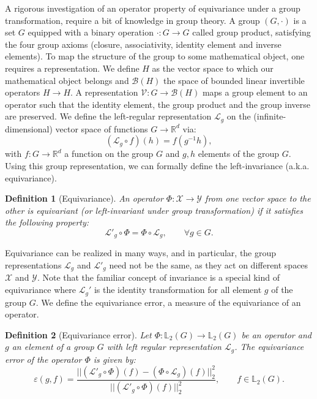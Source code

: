 \documentclass{article}
\newtheorem{definition}{Definition}[section]
\begin{document}
A rigorous investigation of an operator property of equivariance under a group transformation, require a bit of knowledge in group theory. A group $(G, \cdot)$ is a set $G$ equipped with a binary operation $\cdot : G \to G$ called group product, satisfying the four group axioms (closure, associativity, identity element and inverse elements). To map the structure of the group to some mathematical object, one requires a representation. We define $H$ as the vector space to which our mathematical object belongs and $\mathcal{B}(H)$ the space of bounded linear invertible operators $H \to H$. A representation $\mathcal{V} : G \to \mathcal{B}(H)$ maps a group element to an operator such that the identity element, the group product and the group inverse are preserved. We define the left-regular representation $\mathcal{L}_g$ on the (infinite-dimensional) vector space of functions $G \to \mathbb{R}^d$ via:
\begin{equation}
(\mathcal{L}_g \circ f )(h) = f(g^{-1}h),
\end{equation}
with $f : G \to \mathbb{R}^d$ a function on the group $G$ and $g, h$ elements of the group $G$. Using this group representation, we can formally define the left-invariance (a.k.a. equivariance).

\begin{definition}[Equivariance] \label{def:equivariance}
An operator $\Phi : \mathcal{X} \to \mathcal{Y}$ from one vector space to the other is equivariant (or left-invariant under group transformation) if it satisfies the following property:
\begin{equation}
\mathcal{L}'_g \circ \Phi = \Phi \circ \mathcal{L}_g, \qquad \forall g \in G.
\end{equation}
\end{definition}

Equivariance can be realized in many ways, and in particular, the group representations $\mathcal{L}_g$ and $\mathcal{L}'_g$ need not be the same, as they act on different spaces $\mathcal{X}$ and $\mathcal{Y}$. Note that the familiar concept of invariance is a special kind of equivariance where  $\mathcal{L}_g'$ is the identity transformation for all element $g$ of the group $G$. We define the equivariance error, a measure of the equivariance of an operator.

\begin{definition}[Equivariance error] \label{def:equiv_err}
Let $\Phi : \mathbb{L}_2(G) \to \mathbb{L}_2(G)$ be an operator and $g$ an element of a group $G$ with left regular representation $\mathcal{L}_g$. The equivariance error of the operator $\Phi$ is given by:
\begin{equation}
\varepsilon(g, f) = \frac{|| (\mathcal{L}'_g \circ \Phi )(f) - ( \Phi \circ \mathcal{L}_g) (f)||_2^2}{|| (\mathcal{L}'_g \circ \Phi )(f)||_2^2}, \qquad f \in \mathbb{L}_2(G).
\end{equation}
\end{definition}
\end{document}

